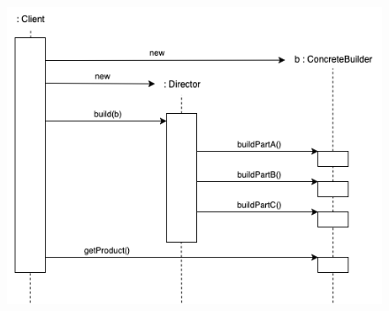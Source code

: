 \begin{figure}[H]
    \centering
    \includegraphics[width=1\linewidth]{assets/pattern/builder/builder-sequence.drawio.png}
\end{figure}

\newpage